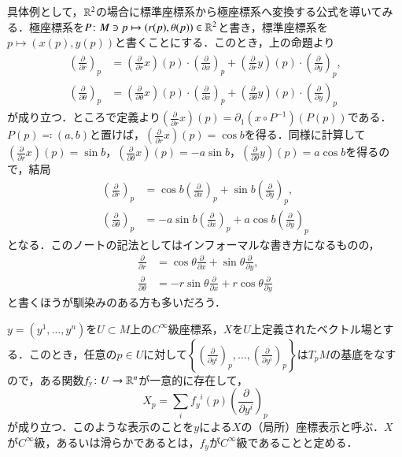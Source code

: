 \begin{exm}
具体例として，$\mathbb{R}^2$の場合に標準座標系から極座標系へ変換する公式を導いてみる．極座標系を$P \colon M \ni p \mapsto (r(p), \theta(p)) \in \mathbb{R}^2$と書き，標準座標系を$p \mapsto (x(p), y(p))$と書くことにする．このとき，上の命題より
\begin{align}
\left( \frac{\partial}{\partial r} \right)_p &= \left( \frac{\partial}{\partial r} x\right)(p) \cdot \left( \frac{\partial}{\partial x} \right)_p + \left( \frac{\partial}{\partial r} y\right)(p) \cdot \left( \frac{\partial}{\partial y} \right)_p, \\
\left( \frac{\partial}{\partial \theta} \right)_p &= \left( \frac{\partial}{\partial \theta} x\right)(p) \cdot \left( \frac{\partial}{\partial x} \right)_p + \left( \frac{\partial}{\partial \theta} y\right)(p) \cdot \left( \frac{\partial}{\partial y} \right)_p
\end{align}が成り立つ．ところで定義より$\left( \frac{\partial}{\partial r} x\right)(p) = \partial_1(x \circ P^{-1})(P(p)) $である．$P(p) \eqqcolon (a,b)$と置けば，$\left( \frac{\partial}{\partial r} x\right)(p) = \cos b$を得る．同様に計算して$\left( \frac{\partial}{\partial r} x\right)(p) = \sin b$，$\left( \frac{\partial}{\partial \theta} x\right)(p) = - a \sin b$，$\left( \frac{\partial}{\partial \theta} y\right)(p) = a \cos b$を得るので，結局
\begin{align}
\left( \frac{\partial}{\partial r} \right)_p &= \cos b \left( \frac{\partial}{\partial x} \right)_p + \sin b \left( \frac{\partial}{\partial y} \right)_p, \\
\left( \frac{\partial}{\partial \theta} \right)_p &= - a\sin b \left( \frac{\partial}{\partial x} \right)_p + a \cos b \left( \frac{\partial}{\partial y} \right)_p
\end{align}となる．このノートの記法としてはインフォーマルな書き方になるものの，
\begin{align}
\frac{\partial}{\partial r} &= \cos \theta \frac{\partial}{\partial x} + \sin \theta \frac{\partial}{\partial y}, \\
\frac{\partial}{\partial \theta} &= - r\sin \theta \frac{\partial}{\partial x} + r \cos \theta \frac{\partial}{\partial y}
\end{align}と書くほうが馴染みのある方も多いだろう．
\end{exm}

\begin{defi}
$y = (y^1, \dots, y^n)$を$U \subset M$上の$C^\infty$級座標系，$X$を$U$上定義されたベクトル場とする．このとき，任意の$p \in U$に対して$\left\{ \left(\frac{\partial}{\partial y^i}\right)_p,\dots, \left(\frac{\partial}{\partial y^i}\right)_p \right\}$は$T_pM$の基底をなすので，ある関数$f_y \colon U \to \mathbb{R}^n$が一意的に存在して，
\begin{equation}
X_p = \sum_{i} {f_y}^i(p) \left( \frac{\partial}{\partial y^i} \right)_p
\end{equation}が成り立つ．このような表示のことを$y$による$X$の（局所）座標表示と呼ぶ．$X$が$C^\infty$級，あるいは滑らかであるとは，$f_y$が$C^\infty$級であることと定める．
\end{defi}

